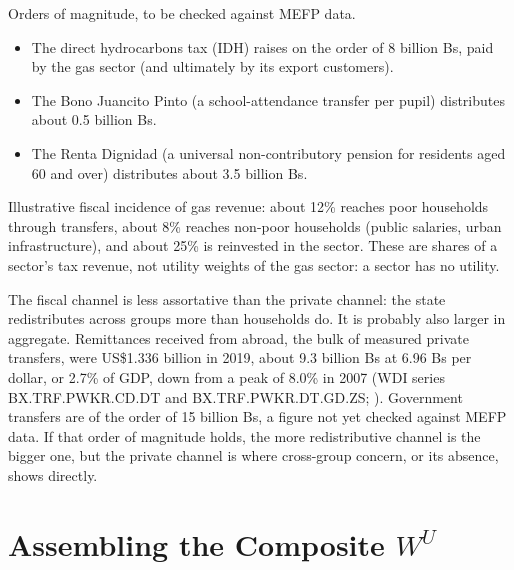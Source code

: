 \documentclass[../structural_economics_book.tex]{subfiles}
\begin{document}
\begin{example}\label{ch22:ex:fiscal}
Orders of magnitude, to be checked against MEFP data. %
\begin{itemize}
\item The direct hydrocarbons tax (IDH) raises on the order of 8 billion Bs, paid by the gas sector (and ultimately by its export customers).
\item The Bono Juancito Pinto (a school-attendance transfer per pupil) distributes about 0.5 billion Bs.
\item The Renta Dignidad (a universal non-contributory pension for residents aged 60 and over) distributes about 3.5 billion Bs.
\end{itemize}

Illustrative fiscal incidence of gas revenue: about 12\% reaches poor households through transfers, about 8\% reaches non-poor households (public salaries, urban infrastructure), and about 25\% is reinvested in the sector. These are shares of a sector's tax revenue, not utility weights of the gas sector: a sector has no utility.

The fiscal channel is less assortative than the private channel: the state redistributes across groups more than households do. It is probably also larger in aggregate. Remittances received from abroad, the bulk of measured private transfers, were US\$1.336 billion in 2019, about 9.3 billion Bs at 6.96 Bs per dollar, or 2.7\% of GDP, down from a peak of 8.0\% in 2007 (WDI series BX.TRF.PWKR.CD.DT and BX.TRF.PWKR.DT.GD.ZS; \citealp{worldbank2026wdi}). Government transfers are of the order of 15 billion Bs, a figure not yet checked against MEFP data. If that order of magnitude holds, the more redistributive channel is the bigger one, but the private channel is where cross-group concern, or its absence, shows directly.
\end{example}


\section{Assembling the Composite $W^U$}
\label{ch22:sec:composite}
\end{document}
